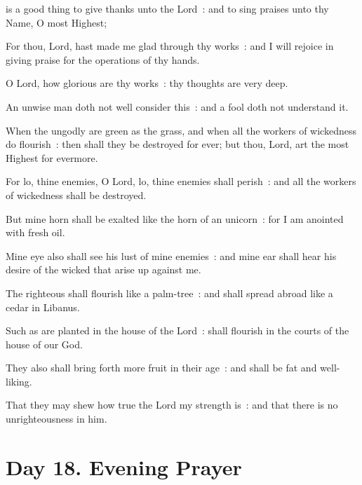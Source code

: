 
 is a good thing to give thanks unto the Lord~: and to sing praises unto thy Name, O most Highest;\par
{}
For thou, Lord, hast made me glad through thy works~: and I will rejoice in giving praise for the operations of thy hands.\par
{}O Lord, how glorious are thy works~: thy thoughts are very deep.\par
{}An unwise man doth not well consider this~: and a fool doth not understand it.\par
{}When the ungodly are green as the grass, and when all the workers of wickedness do flourish~: then shall they be destroyed for ever; but thou, Lord, art the most Highest for evermore.\par
{}For lo, thine enemies, O Lord, lo, thine enemies shall perish~: and all the workers of wickedness shall be destroyed.\par
{}But mine horn shall be exalted like the horn of an unicorn~: for I am anointed with fresh oil.\par
{}Mine eye also shall see his lust of mine enemies~: and mine ear shall hear his desire of the wicked that arise up against me.\par
{}The righteous shall flourish like a palm-tree~: and shall spread abroad like a cedar in Libanus.\par
{}Such as are planted in the house of the Lord~: shall flourish in the courts of the house of our God.\par
{}They also shall bring forth more fruit in their age~: and shall be fat and well-liking.\par
{}That they may shew how true the Lord my strength is~: and that there is no unrighteousness in him.\par

\section*{Day 18. Evening Prayer}

